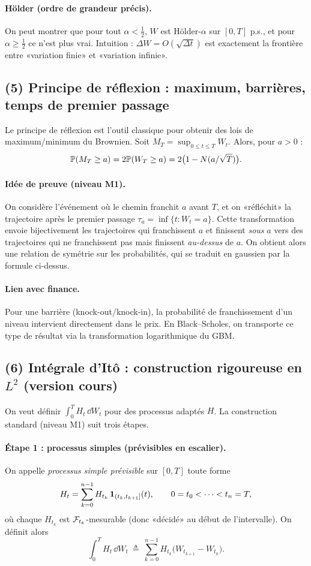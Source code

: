 \paragraph{Hölder (ordre de grandeur précis).}
On peut montrer que pour tout $\alpha<\tfrac12$, $W$ est Hölder-$\alpha$ sur $[0,T]$ p.s., et pour $\alpha\ge\tfrac12$ ce n'est plus vrai.
Intuition : $\Delta W=O(\sqrt{\Delta t})$ est exactement la frontière entre «variation finie» et «variation infinie».

\subsection*{(5) Principe de réflexion : maximum, barrières, temps de premier passage}
Le principe de réflexion est l'outil classique pour obtenir des lois de maximum/minimum du Brownien.
Soit $M_T=\sup_{0\le t\le T} W_t$.
Alors, pour $a>0$ :
\[
\mathbb{P}(M_T\ge a)=2\mathbb{P}(W_T\ge a)=2\bigl(1-N(a/\sqrt{T})\bigr).
\]
\paragraph{Idée de preuve (niveau M1).}
On considère l'événement où le chemin franchit $a$ avant $T$, et on «réfléchit» la trajectoire après le premier passage $\tau_a=\inf\{t:W_t=a\}$.
Cette transformation envoie bijectivement les trajectoires qui franchissent $a$ et finissent \emph{sous} $a$ vers des trajectoires qui ne franchissent pas mais finissent \emph{au-dessus} de $a$.
On obtient alors une relation de symétrie sur les probabilités, qui se traduit en gaussien par la formule ci-dessus.

\paragraph{Lien avec finance.}
Pour une barrière (knock-out/knock-in), la probabilité de franchissement d'un niveau intervient directement dans le prix.
En Black--Scholes, on transporte ce type de résultat via la transformation logarithmique du GBM.

\subsection*{(6) Intégrale d'Itô : construction rigoureuse en $L^2$ (version cours)}
On veut définir $\int_0^T H_t\,\dd W_t$ pour des processus adaptés $H$.
La construction standard (niveau M1) suit trois étapes.

\paragraph{Étape 1 : processus simples (prévisibles en escalier).}
On appelle \emph{processus simple prévisible} sur $[0,T]$ toute forme
\[
H_t=\sum_{k=0}^{n-1} H_{t_k}\,\mathbf{1}_{(t_k,t_{k+1}]}(t),
\qquad 0=t_0<\dots<t_n=T,
\]
où chaque $H_{t_k}$ est $\mathcal{F}_{t_k}$-mesurable (donc «décidé» au début de l'intervalle).
On définit alors
\[
\int_0^T H_t\,\dd W_t\ \triangleq\ \sum_{k=0}^{n-1} H_{t_k}\bigl(W_{t_{k+1}}-W_{t_k}\bigr).
\]


